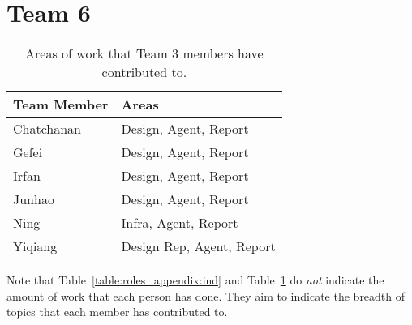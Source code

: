 \section{Team 6}
\label{sec:roles_appendix:team6}
\begin{table}[H]
    \centering
    \begin{tabular}{|l|l|}
    \hline
    \textbf{Team Member} & \textbf{Areas}       \\ \hline
    Chatchanan     & Design, Agent, Report             \\
    Gefei    & Design, Agent, Report        \\
    Irfan  & Design, Agent, Report         \\
    Junhao     & Design, Agent, Report           \\
    Ning  & Infra, Agent, Report           \\
    Yiqiang  & Design Rep, Agent, Report         \\\hline
    
\end{tabular}
\caption{Areas of work that Team 3 members have contributed to.}
\label{sec:roles_appendix:team1}
\end{table}


Note that Table~\ref{table:roles_appendix:ind} and Table~\ref{sec:roles_appendix:team1} do \emph{not} indicate the amount of work that each person has done. They aim to indicate the breadth of topics that each member has contributed to. 
